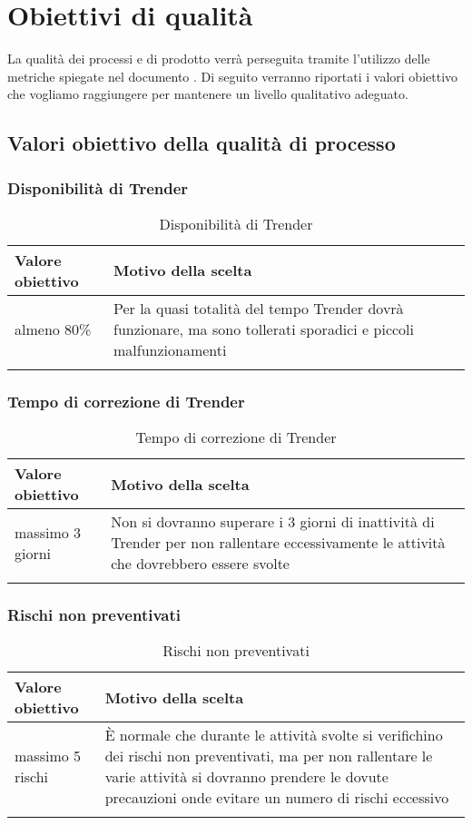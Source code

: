 \documentclass[../PianoDiQualifica.tex]{subfiles}
\begin{document}
\section{Obiettivi di qualità}

	La qualità dei processi e di prodotto verrà perseguita tramite l'utilizzo delle metriche spiegate nel documento \normediprogettov. Di seguito verranno riportati i valori obiettivo che vogliamo raggiungere per mantenere un livello qualitativo adeguato.
	
	\subsection{Valori obiettivo della qualità di processo}
	
		\subsubsection{Disponibilità di Trender}
			\begin{longtable}[c] { >{\centering\arraybackslash}p{4cm} p{7cm} }
				\toprule
				\centerline{\textbf{Valore obiettivo}} & \centerline{\textbf{Motivo della scelta}} \\
				\midrule
					almeno 80\% &	Per la quasi totalità del tempo Trender dovrà funzionare, ma sono tollerati sporadici e piccoli malfunzionamenti \\
				\bottomrule
				\caption{Disponibilità di Trender}
			\end{longtable}
		
		\subsubsection{Tempo di correzione di Trender}	
			\begin{longtable}[c] { >{\centering\arraybackslash}p{4cm} p{7cm} }
				\toprule
				\centerline{\textbf{Valore obiettivo}} & \centerline{\textbf{Motivo della scelta}} \\
				\midrule
					massimo 3 giorni &	 Non si dovranno superare i 3 giorni di inattività di Trender per non rallentare eccessivamente le attività che dovrebbero essere svolte \\
				\bottomrule
				\caption{Tempo di correzione di Trender}
			\end{longtable}
			
		\subsubsection{Rischi non preventivati}
			\begin{longtable}[c] { >{\centering\arraybackslash}p{4cm} p{7cm} }
				\toprule
				\centerline{\textbf{Valore obiettivo}} & \centerline{\textbf{Motivo della scelta}} \\
				\midrule
					massimo 5 rischi &	È normale che durante le attività svolte si verifichino dei rischi non preventivati, ma per non rallentare le varie attività si dovranno prendere le dovute precauzioni onde evitare un numero di rischi eccessivo  \\
				\bottomrule
				\caption{Rischi non preventivati}
			\end{longtable}
			
\end{document}
